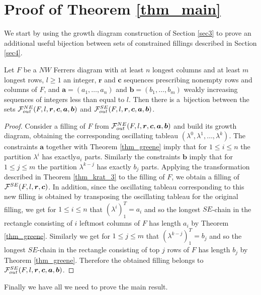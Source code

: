 \section{Proof of Theorem \ref{thm_main}}

We start by using the growth diagram construction of Section \ref{sec3} to prove an additional useful bijection
between sets of constrained fillings described in Section \ref{sec4}.

\begin{lemma}\label{lemma_flip}
Let $F$ be a $NW$ Ferrers diagram with at least $n$ longest columns and at least $m$ longest rows, 
$l \geq 1$ an integer, $\bm{r}$ and $\bm{c}$ sequences prescribing nonempty
rows and columns of $F$, and $\bm{a} = (a_1, \ldots, a_n)$ and $\bm{b} = (b_1, \ldots, b_m)$ weakly increasing
sequences of integers less than equal to $l$. Then there is a~bijection between the sets
$\mathcal{F}^{NE}_{out}(F, l, \bm{r}, \bm{c}, \bm{a}, \bm{b})$ and $\mathcal{F}^{SE}_{out}(F, l, \bm{r}, \bm{c}, \bm{a}, \bm{b})$.
\end{lemma}
\begin{proof}
Consider a filling of $F$ from $\mathcal{F}^{NE}_{out}(F, l, \bm{r}, \bm{c}, \bm{a}, \bm{b})$
and build its growth diagram, obtaining the corresponding oscillating tableau $(\lambda^0, \lambda^1, \ldots, \lambda^k)$.
The constraints $\bm{a}$ together with Theorem \ref{thm_greene} imply that for $1 \leq i \leq n$ the partition $\lambda^i$
has exactly$a_i$ parts. Similarly the constraints $\bm{b}$ imply that for $1 \leq j \leq m$ the partition $\lambda^{k-j}$
has exactly $b_j$ parts. Applying the transformation described in Theorem \ref{thm_krat_3} to the filling of $F$,
we obtain a filling of $\mathcal{F}^{SE}(F, l, \bm{r}, \bm{c})$. In addition, since the oscillating tableau corresponding
to this new filling is obtained by transposing the oscillating tableau for the original filling,
we get for $1 \leq i \leq n$ that $(\lambda^i)^T_1 = a_i$ and so the longest $SE$-chain in the rectangle consisting of $i$ leftmost columns
of $F$ has length $a_i$ by Theorem \ref{thm_greene}. Similarly we get for $1 \leq j \leq m$
that $(\lambda^{k-j})^T_1 = b_j$ and so the longest $SE$-chain in the rectangle consisting of top $j$ rows of $F$ has length
 $b_j$ by Theorem \ref{thm_greene}. Therefore the obtained filling belongs
to $\mathcal{F}^{SE}_{out}(F, l, \bm{r}, \bm{c}, \bm{a}, \bm{b})$.
\end{proof}

Finally we have all we need to prove the main result.

